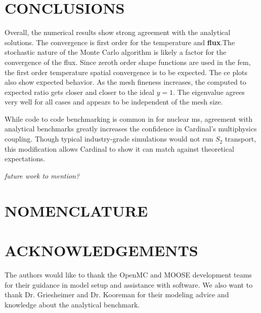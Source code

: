 \documentclass[letterpaper]{mc2023}
\begin{document}
\section{CONCLUSIONS}\label{sec:conclusions}

Overall, the numerical results show strong agreement with the analytical solutions. The convergence is first order for the temperature
and \textbf{flux}.The stochastic nature of the Monte Carlo algorithm is likely a factor for the convergence of the flux. Since zeroth
order shape functions are used in the \gls{fem}, the first order temperature spatial convergence is to be expected. \cite{moose-convergence}
The \gls{ce} plots also show expected behavior. As the mesh fineness increases, the computed to expected ratio gets closer and closer to
the ideal $y=1$. The eigenvalue agrees very well for all cases and appears to be independent of the mesh size.

While code to code benchmarking is common in for nuclear \gls{ms}, agreement with analytical benchmarks greatly increases the confidence
in Cardinal's multiphysics coupling. Though typical industry-grade simulations would not run $S_{2}$ transport, this modification allows
Cardinal to show it can match against theoretical expectations.

\textit{future work to mention?}

\section*{NOMENCLATURE}

\printglossary[title={Nomenclature}, nonumberlist, nopostdot]

\section*{ACKNOWLEDGEMENTS}
The authors would like to thank the OpenMC and MOOSE development teams for their guidance in model setup and assistance
with software. We also want to thank Dr. Griesheimer and Dr. Kooreman for their modeling advice and knowledge about the
analytical benchmark.

\setlength{\baselineskip}{12pt}


\setlength{\baselineskip}{12pt}
\end{document}
